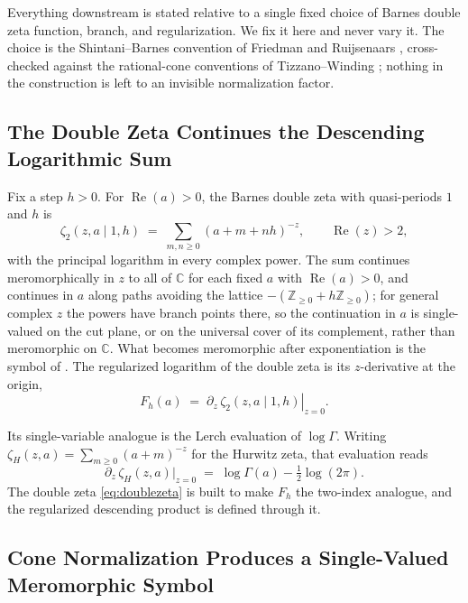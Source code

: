\documentclass[11pt,letterpaper]{article}
\newcommand{\Fh}{F_h}
\newcommand{\Zt}{\zeta_2}
\newcommand{\Zint}{\mathbb{Z}}
\newcommand{\Cc}{\mathbb{C}}
\DeclareMathOperator{\Real}{Re}
\begin{document}
Everything downstream is stated relative to a single fixed choice of Barnes
double zeta function, branch, and regularization. We fix it here and never vary
it. The choice is the Shintani--Barnes convention of Friedman and
Ruijsenaars \cite{FR}, cross-checked against the rational-cone conventions of
Tizzano--Winding \cite{TW}; nothing in the construction is left to an invisible
normalization factor.

\subsection{The Double Zeta Continues the Descending Logarithmic Sum}

\begin{definition}
\label{def:barnes}
Fix a step $h>0$. For $\Real(a)>0$, the Barnes double zeta with quasi-periods
$1$ and $h$ is
\begin{equation}
  \Zt(z,a\mid 1,h) \;=\; \sum_{m,n\ge 0}(a+m+nh)^{-z},
  \qquad \Real(z)>2,
  \label{eq:doublezeta}
\end{equation}
with the principal logarithm in every complex power. The sum continues
meromorphically in $z$ to all of $\Cc$ for each fixed $a$ with $\Real(a)>0$, and
continues in $a$ along paths avoiding the lattice $-(\Zint_{\ge0}+h\Zint_{\ge0})$;
for general complex $z$ the powers have branch points there, so the continuation
in $a$ is single-valued on the cut plane, or on the universal cover of its
complement, rather than meromorphic on $\Cc$. What becomes meromorphic after
exponentiation is the symbol of . The regularized logarithm of
the double zeta is its $z$-derivative at the origin,
\begin{equation}
  \Fh(a) \;=\; \left.\partial_z\,\Zt(z,a\mid 1,h)\right|_{z=0}.
  \label{eq:Fdef}
\end{equation}
\end{definition}

Its single-variable analogue is the Lerch evaluation of $\log\Gamma$. Writing
$\zeta_H(z,a)=\sum_{m\ge 0}(a+m)^{-z}$ for the Hurwitz zeta, that evaluation
reads
\begin{equation}
  \partial_z\,\zeta_H(z,a)\big|_{z=0} \;=\; \log\Gamma(a)-\tfrac12\log(2\pi).
  \label{eq:lerch}
\end{equation}
The double zeta \eqref{eq:doublezeta} is built to make $\Fh$ the two-index
analogue, and the regularized descending product is defined through it.

\subsection{Cone Normalization Produces a Single-Valued Meromorphic Symbol}
\end{document}

